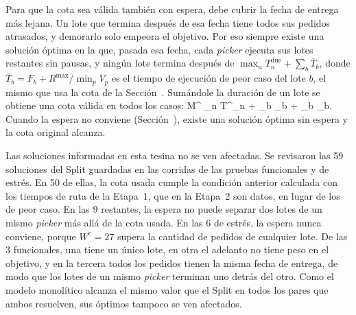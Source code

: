 Para que la cota sea válida también con espera, debe cubrir la fecha de
entrega más lejana. Un lote que termina después de esa fecha tiene todos sus
pedidos atrasados, y demorarlo solo empeora el objetivo. Por eso siempre
existe una solución óptima en la que, pasada esa fecha, cada {\em picker}
ejecuta sus lotes restantes sin pausas, y ningún lote termina después de
${\max_{n} T^{\text{due}}_n + \sum_{b} \overline{T}_b}$, donde
$\overline{T}_b = F_b + R^{\max} / \min_{p} V_p$ es el tiempo de ejecución de
peor caso del lote $b$, el mismo que usa la cota de la
Sección~. Sumándole la duración de un lote se obtiene una
cota válida en todos los casos:
\startformula
	M^{} \geq \max_{n \in {}} T^{}_n
	+ \sum_{b \in {}} _b + \max_{b \in {}} _b.
\stopformula
Cuando la espera no conviene (Sección~), existe una
solución óptima sin espera y la cota original alcanza.

Las soluciones informadas en esta tesina no se ven afectadas. Se revisaron las
59 soluciones del Split guardadas en las corridas de las pruebas funcionales y
de estrés. En 50 de ellas, la cota usada cumple la condición anterior
calculada con los tiempos de ruta de la Etapa~1, que en la Etapa~2 son datos,
en lugar de los de peor caso. En las 9 restantes, la espera no puede separar
dos lotes de un mismo {\em picker} más allá de la cota usada. En las 6 de
estrés, la espera nunca conviene, porque $W^{c} = 27$ supera la cantidad de
pedidos de cualquier lote. De las 3 funcionales, una tiene un único lote, en
otra el adelanto no tiene peso en el objetivo, y en la tercera todos los
pedidos tienen la misma fecha de entrega, de modo que los lotes de un mismo
{\em picker} terminan uno detrás del otro. Como el modelo monolítico alcanza
el mismo valor que el Split en todos los pares que ambos resuelven, sus
óptimos tampoco se ven afectados.

\stopsection
\stopchapter
